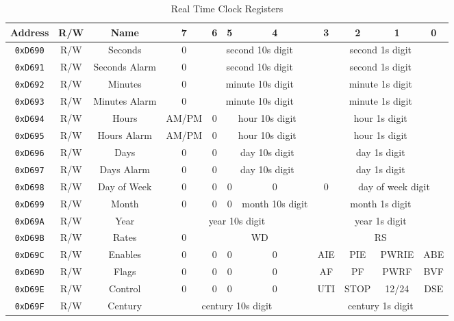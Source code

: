 \begin{table}[ht]
	\begin{center}
		\begin{tabular}{| c | c | c || c | c | c | c | c | c | c | c |} \hline
			Address & R/W & Name & 7 & 6 & 5 & 4 & 3 & 2 & 1 & 0 \\ \hline\hline
			\verb+0xD690+ & R/W & Seconds & 0 & \multicolumn{3}{|c|}{second 10s digit} & \multicolumn{4}{|c|}{second 1s digit} \\ \hline
            \verb+0xD691+ & R/W & Seconds Alarm & 0 & \multicolumn{3}{|c|}{second 10s digit} & \multicolumn{4}{|c|}{second 1s digit} \\ \hline
            \verb+0xD692+ & R/W & Minutes & 0 & \multicolumn{3}{|c|}{minute 10s digit} & \multicolumn{4}{|c|}{minute 1s digit} \\ \hline
            \verb+0xD693+ & R/W & Minutes Alarm & 0 & \multicolumn{3}{|c|}{minute 10s digit} & \multicolumn{4}{|c|}{minute 1s digit} \\ \hline
            \verb+0xD694+ & R/W & Hours & AM/PM & 0 & \multicolumn{2}{|c|}{hour 10s digit} & \multicolumn{4}{|c|}{hour 1s digit} \\ \hline
            \verb+0xD695+ & R/W & Hours Alarm & AM/PM & 0 & \multicolumn{2}{|c|}{hour 10s digit} & \multicolumn{4}{|c|}{hour 1s digit} \\ \hline
            \verb+0xD696+ & R/W & Days & 0 & 0 & \multicolumn{2}{|c|}{day 10s digit} & \multicolumn{4}{|c|}{day 1s digit} \\ \hline
            \verb+0xD697+ & R/W & Days Alarm & 0 & 0 & \multicolumn{2}{|c|}{day 10s digit} & \multicolumn{4}{|c|}{day 1s digit} \\ \hline
            \verb+0xD698+ & R/W & Day of Week & 0 & 0 & 0 & 0 & 0 & \multicolumn{3}{|c|}{day of week digit} \\ \hline
            \verb+0xD699+ & R/W & Month & 0 & 0 & 0 & month 10s digit & \multicolumn{4}{|c|}{month 1s digit} \\ \hline
            \verb+0xD69A+ & R/W & Year & \multicolumn{4}{|c|}{year 10s digit} & \multicolumn{4}{|c|}{year 1s digit}  \\ \hline
            \verb+0xD69B+ & R/W & Rates & 0 & \multicolumn{3}{|c|}{WD} & \multicolumn{4}{|c|}{RS} \\ \hline
            \verb+0xD69C+ & R/W & Enables & 0 & 0 & 0 & 0 & AIE & PIE & PWRIE & ABE \\ \hline
            \verb+0xD69D+ & R/W & Flags & 0 & 0 & 0 & 0 & AF & PF & PWRF & BVF \\ \hline
            \verb+0xD69E+ & R/W & Control & 0 & 0 & 0 & 0 & UTI & STOP & 12/24 & DSE \\ \hline
            \verb+0xD69F+ & R/W & Century & \multicolumn{4}{|c|}{century 10s digit} & \multicolumn{4}{|c|}{century 1s digit}  \\ \hline
		\end{tabular}
	\end{center}
	\caption{Real Time Clock Registers}
	\label{tab:rtc_registers}
\end{table}

